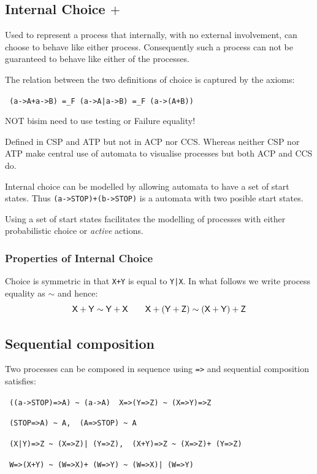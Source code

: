 \documentclass[]{article}
\begin{document}
{
\subsection{Internal  Choice $+$}


Used to represent a process that internally, with no external involvement, can choose to behave like either process. Consequently such a process can not be guaranteed to behave like either of the processes.

The relation between the two definitions of choice is captured by the axioms:


\hspace{\fill}\verb$ (a->A+a->B) =_F (a->A|a->B) =_F (a->(A+B))$\hspace{\fill}

{\color{red} NOT bisim need to use testing or Failure equality!}

Defined in CSP and ATP but not in ACP nor CCS. Whereas neither CSP nor ATP make central use of automata to visualise processes but both ACP and CCS do.

Internal choice can be modelled by allowing automata to have a set of start states.  Thus \verb$(a->STOP)+(b->STOP)$ is a automata with two posible start states.


Using a set of start states  facilitates the modelling of processes  with either  probabilistic choice or  \emph{active} actions.

\subsubsection{Properties of Internal Choice}
 Choice is symmetric in that \verb$X+Y$ is equal to \verb$Y|X$. In what follows we write process equality as $\sim$ and hence:
 \[\sf X+Y\sim Y+X \qquad X+(Y+Z)\sim (X+Y)+Z\]
 
 

}
\subsection{Sequential composition}

Two processes can be composed in sequence using \verb|=>|   and sequential composition satisfies:

\begin{center}
\verb$ ((a->STOP)=>A) ~ (a->A)  X=>(Y=>Z) ~ (X=>Y)=>Z$

\verb$ (STOP=>A) ~ A,  (A=>STOP) ~ A $

\verb$ (X|Y)=>Z ~ (X=>Z)| (Y=>Z),  (X+Y)=>Z ~ (X=>Z)+ (Y=>Z)$

\verb$ W=>(X+Y) ~ (W=>X)+ (W=>Y) ~ (W=>X)| (W=>Y)$
\end{center}
\end{document}
